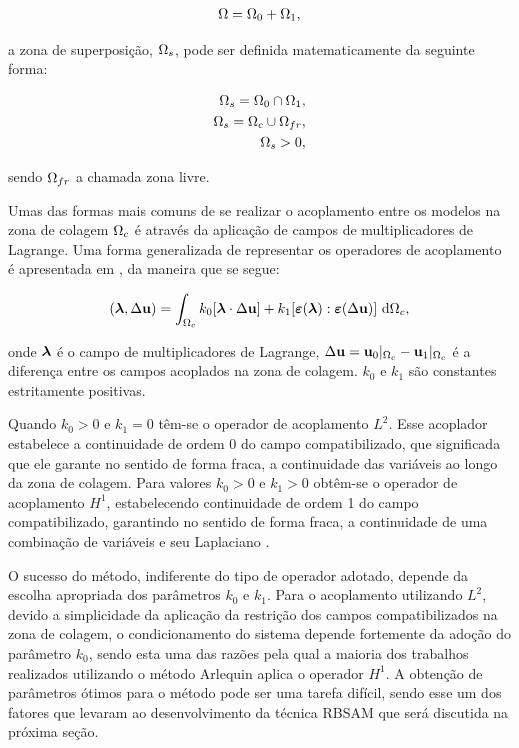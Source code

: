 \documentclass[tese_patricia]{subfiles}
\begin{document}
\begin{align}
	\Omega = \Omega_0 + \Omega_1, 
\end{align}

\noindent a zona de superposição, $\Omega_s$, pode ser definida matematicamente da seguinte forma:

\begin{align}
	\Omega_s = \Omega_0 \cap \Omega_1, \\
	\Omega_s = \Omega_c \cup \Omega_{fr}, \\
	\Omega_s > 0, 
\end{align}

\noindent sendo  $\Omega_{fr}$ a chamada zona livre.

Umas das formas mais comuns de se realizar o acoplamento entre os modelos na zona de colagem $\Omega_c$ é através da aplicação de campos de multiplicadores de Lagrange. Uma forma generalizada de representar os operadores de acoplamento é apresentada em , da maneira que se segue:

\begin{align}
	(\boldsymbol{\lambda},\Delta \mathbf{u}) =  \int_{\Omega_c} k_{0}[\boldsymbol{\lambda} \cdot \Delta \mathbf{u} ] + k_{1}[\bm{\varepsilon} (\boldsymbol{\lambda}) : \bm{\varepsilon} (\Delta \mathbf{u})] \ \mathrm{d} \Omega_c,
\end{align}

\noindent onde $\boldsymbol{\lambda}$ é o campo de multiplicadores de Lagrange, $\Delta \mathbf{u} = \mathbf{u}_0 |_{\Omega_c} - \mathbf{u}_1 |_{\Omega_c}$ é a diferença entre os campos acoplados na zona de colagem. $k_{0}$ e $k_{1}$ são constantes estritamente positivas. 

Quando $k_{0} > 0$ e $k_{1} = 0 $ têm-se o operador de acoplamento $L^{2}$. Esse acoplador estabelece a continuidade de ordem 0 do campo compatibilizado, que significada que ele garante no sentido de forma fraca, a continuidade das variáveis ao longo da zona de colagem. Para valores $k_{0} > 0$ e $k_{1} > 0 $ obtêm-se o operador de acoplamento $H^{1}$, estabelecendo continuidade de ordem 1 do campo compatibilizado, garantindo no sentido de forma fraca, a continuidade de uma combinação de variáveis e seu Laplaciano \cite{GuidaultAndBelytschko2007}.

O sucesso do método, indiferente do tipo de operador adotado, depende da escolha apropriada dos parâmetros $k_{0}$ e $k_{1}$. Para o acoplamento utilizando $L^{2}$, devido a simplicidade da aplicação da restrição dos campos compatibilizados na zona de colagem, o condicionamento do sistema depende fortemente da adoção do parâmetro $k_{0}$, sendo esta uma das razões pela qual a maioria dos trabalhos realizados utilizando o método Arlequin aplica o operador $H^{1}$. A obtenção de parâmetros ótimos para o método pode ser uma tarefa difícil, sendo esse um dos fatores que levaram  ao desenvolvimento da técnica RBSAM que será discutida na próxima seção.
\end{document}
